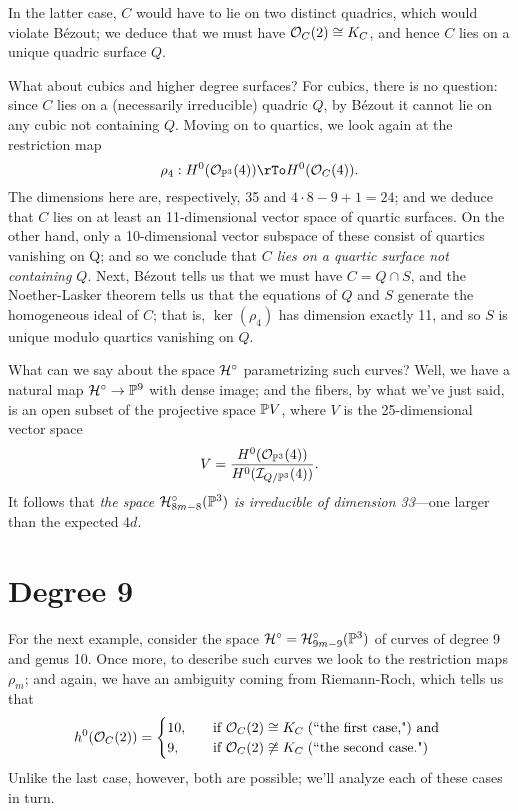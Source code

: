 In the latter case, $C$ would have to lie on two distinct quadrics, which would violate B\'ezout; we deduce that we must have $\cO_C(2) \cong K_C$, and hence $C$ lies on a unique quadric surface $Q$.

What about cubics and higher degree surfaces? For cubics, there is no question: since $C$ lies on a (necessarily irreducible) quadric $Q$, by B\'ezout it cannot lie on any cubic not containing $Q$. Moving on to quartics, we look again at the restriction map
$$
\rho_4 : H^0(\cO_{\PP^3}(4)) \rTo H^0(\cO_C(4)).
$$
The dimensions here are, respectively, 35 and $4\cdot 8 - 9 + 1 = 24$; and we deduce that $C$ lies on at least an 11-dimensional vector space of quartic surfaces. On the other hand, only a 10-dimensional vector subspace of these consist of quartics vanishing on Q; and so we conclude that \emph{$C$ lies on a quartic surface not containing $Q$}. Next, B\'ezout tells us that we must have $C = Q \cap S$, and the Noether-Lasker theorem tells us that the equations of $Q$ and $S$ generate the homogeneous ideal of $C$; that is, $\ker(\rho_4)$ has dimension exactly 11, and so $S$ is unique modulo quartics vanishing on $Q$.

What can we say about the space $\cH^\circ$ parametrizing such curves? Well, we have a natural map $\cH^\circ \to \PP^9$ with dense image; and the fibers, by what we've just said, is an open subset of the projective space $\PP V$, where $V$ is the 25-dimensional vector space
$$
V = \frac{H^0(\cO_{\PP^3}(4))}{H^0(\cI_{Q/\PP^3}(4))}.
$$
It follows that \emph{the space $\cH^\circ_{8m-8}(\PP^3)$ is irreducible of dimension 33}---one larger than the expected $4d$.


\section{Degree 9}

For the next example, consider the space $\cH^\circ = \cH^\circ_{9m-9}(\PP^3)$ of curves of degree 9 and genus 10. Once more, to describe such curves we look to the restriction maps $\rho_m$; and again, we have an ambiguity coming from Riemann-Roch, which tells us that
\begin{align*}
h^0(\cO_C(2)) =
\begin{cases}
10, \quad &\text{if } \cO_C(2) \cong K_C \; \text{(``the first case,") and } \\
9,  \quad &\text{if } \cO_C(2) \not\cong K_C  \; \text{(``the second case.")}
\end{cases}
\end{align*}
Unlike the last case, however, both are possible; we'll analyze each of these cases in turn.

